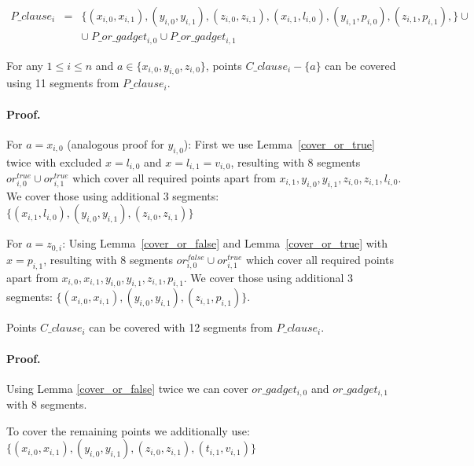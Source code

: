\begin{eqnarray*}
P\_clause_i & = & \{ (x_{i, 0}, x_{i, 1}),
(y_{i, 0}, y_{i, 1}),
(z_{i, 0}, z_{i, 1}),
(x_{i, 1}, l_{i, 0}),
(y_{i, 1}, p_{i, 0}),
(z_{i, 1}, p_{i, 1}),
\} \cup \\
& & \cup \ P\_or\_gadget_{i, 0} \cup P\_or\_gadget_{i, 1}
\end{eqnarray*}

\begin{lemma}
\label{cover_clauses_solution_true}
For any $1 \le i \le n$ and $a \in \{ x_{i, 0}, y_{i, 0}, z_{i, 0}\}$,
points $C\_clause_i - \{a\}$ can be covered using 11 segments
from $P\_clause_i$.
\end{lemma}

\paragraph{Proof.}
For $a = x_{i, 0}$ (analogous proof for $y_{i, 0}$):
First we use Lemma~\ref{cover_or_true} twice with excluded $x = l_{i, 0}$ and
$x = l_{i, 1} = v_{i, 0}$,
resulting with 8 segments $or^{true}_{i, 0} \cup or^{true}_{i, 1}$
which cover all required points apart from
$x_{i, 1}, y_{i, 0}, y_{i, 1}, z_{i, 0}, z_{i, 1}, l_{i, 0}$.
We cover those using additional 3 segments:
$\{ (x_{i, 1}, l_{i, 0}), (y_{i, 0}, y_{i, 1}),
(z_{i, 0}, z_{i, 1}) \}$

For $a = z_{0, i}$:
Using Lemma~\ref{cover_or_false} and Lemma~\ref{cover_or_true} with
$x = p_{i, 1}$,
resulting with 8 segments $or^{false}_{i, 0} \cup or^{true}_{i, 1}$
which cover all required points apart from
$x_{i, 0}, x_{i, 1}, y_{i, 0}, y_{i, 1}, z_{i, 1}, p_{i, 1}$.
We cover those using additional 3 segments:
$\{ (x_{i, 0}, x_{i, 1}), (y_{i, 0}, y_{i, 1}),
(z_{i, 1}, p_{i, 1}) \}$.

\begin{lemma}
\label{cover_clauses_solution_false}
 Points $C\_clause_i$ can be covered with 12 segments from $P\_clause_i$.
\end{lemma}

\paragraph{Proof.}
Using Lemma \ref{cover_or_false} twice we can
cover $or\_gadget_{i,0}$ and  $or\_gadget_{i,1}$
with 8 segments.

To cover the remaining points we additionally use:
$\{ (x_{i, 0}, x_{i, 1}), (y_{i, 0}, y_{i, 1}),
(z_{i, 0}, z_{i, 1}), (t_{i, 1}, v_{i, 1}) \}$


